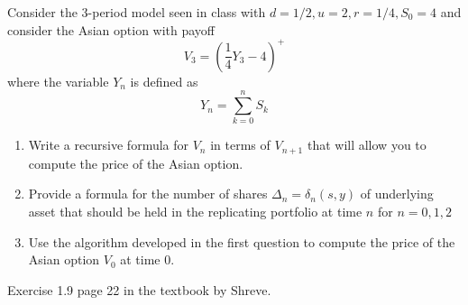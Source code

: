 \documentclass[12pt,twoside, letter]{exam}
\theoremstyle{definition}
\begin{document}
  \par{Consider the 3-period model seen in class with $d = 1/2, u = 2, r = 1/4, S_0 = 4$ and consider the Asian option with payoff}
    \begin{equation*}
      V_3 = (\frac{1}{4}Y_3 - 4)^+
    \end{equation*}
  where the variable $Y_n$ is defined as
    \begin{equation*}
      Y_n = \sum^n_{k=0} S_k
    \end{equation*}
    \begin{enumerate}
      \item Write a recursive formula for $V_n$ in terms of $V_{n+1}$ that will allow you to compute the price of the Asian option.
      \item Provide a formula for the number of shares $\Delta_n = \delta_n(s,y)$ of underlying asset that should be held in the replicating portfolio at
        time $n$ for $n = 0,1,2$
      \item Use the algorithm developed in the first question to compute the price of the Asian option $V_0$ at time 0.
    \end{enumerate}
 Exercise 1.9 page 22 in the textbook by Shreve.
\end{document}

